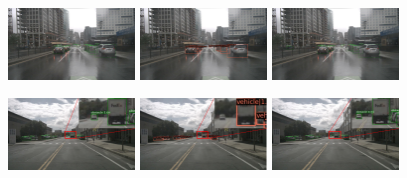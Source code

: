 \documentclass[report.tex]{subfiles}
\begin{document}
\begin{figure}[h!]
        \includegraphics[width=0.3\textwidth]{images/results/saf_vs_hrfuser/samples/s5_rain_reg/n008-2018-09-18-14-18-33-0400__CAM_FRONT__1537295031112404_gt.png}
        \includegraphics[width=0.3\textwidth]{images/results/saf_vs_hrfuser/samples/s5_rain_reg/n008-2018-09-18-14-18-33-0400__CAM_FRONT__1537295031112404_former.jpg}
        \includegraphics[width=0.3\textwidth]{images/results/saf_vs_hrfuser/samples/s5_rain_reg/n008-2018-09-18-14-18-33-0400__CAM_FRONT__1537295031112404.png}
      
        \includegraphics[width=0.3\textwidth]{images/results/saf_vs_hrfuser/samples/s1_small/n008-2018-08-01-15-34-25-0400__CAM_FRONT__1533152226912404_GT_2.jpg}
        \includegraphics[width=0.3\textwidth]{images/results/saf_vs_hrfuser/samples/s1_small/n008-2018-08-01-15-34-25-0400__CAM_FRONT__1533152226912404_former_2.jpg}
        \includegraphics[width=0.3\textwidth]{images/results/saf_vs_hrfuser/samples/s1_small/n008-2018-08-01-15-34-25-0400__CAM_FRONT__1533152226912404_2.jpg}
      

\end{figure}
\end{document}
